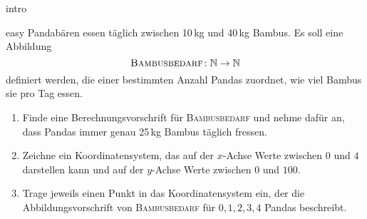 \documentclass[../abbildungen.tex]{subfiles}
\begin{document}
\begin{exercise}{intro}
    
\end{exercise}

\begin{exercise}{easy}
    Pandabären essen täglich zwischen 10\,kg und 40\,kg Bambus. Es soll eine Abbildung \[\textsc{Bambusbedarf}\colon\mathbb{N}\rightarrow\mathbb{N}\] definiert werden, die einer bestimmten Anzahl Pandas zuordnet, wie viel Bambus sie pro Tag essen.
    \begin{enumerate}
        \item Finde eine Berechnungsvorschrift für \textsc{Bambusbedarf} und nehme dafür an, dass Pandas immer genau 25\,kg Bambus täglich fressen.
        \item Zeichne ein Koordinatensystem, das auf der $x$-Achse Werte zwischen $0$ und $4$ darstellen kann und auf der $y$-Achse Werte zwischen $0$ und $100$.
        \item Trage jeweils einen Punkt in das Koordinatensystem ein, der die Abbildungsvorschrift von \textsc{Bambusbedarf} für $0, 1, 2, 3, 4$ Pandas beschreibt.
    \end{enumerate}
\end{exercise}
\end{document}
